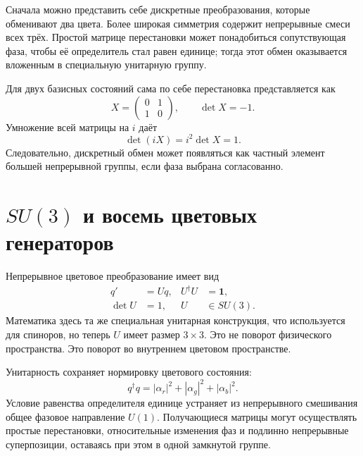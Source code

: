 Сначала можно представить себе дискретные преобразования, которые обменивают два цвета. Более широкая симметрия содержит непрерывные смеси всех трёх. Простой матрице перестановки может понадобиться сопутствующая фаза, чтобы её определитель стал равен единице; тогда этот обмен оказывается вложенным в специальную унитарную группу.

Для двух базисных состояний сама по себе перестановка представляется как
\begin{equation}
X=
\begin{pmatrix}0&1\\1&0\end{pmatrix},
\qquad
\det X=-1.
\end{equation}
Умножение всей матрицы на \(i\) даёт
\begin{equation}
\det(iX)=i^2\det X=1.
\end{equation}
Следовательно, дискретный обмен может появляться как частный элемент большей непрерывной группы, если фаза выбрана согласованно.

\begin{classroomqa}
\end{classroomqa}

\section{\texorpdfstring{\(SU(3)\)}{SU(3)} и восемь цветовых генераторов}

Непрерывное цветовое преобразование имеет вид
\begin{equation}
\begin{aligned}
q'&=Uq,
&
U^\dagger U&=\boldsymbol 1,
\\
\det U&=1,
&
U&\in SU(3).
\end{aligned}
\label{eq:l3-su3-action}
\end{equation}
Математика здесь та же специальная унитарная конструкция, что используется для спиноров, но теперь \(U\) имеет размер \(3\times3\). Это не поворот физического пространства. Это поворот во внутреннем цветовом пространстве.

Унитарность сохраняет нормировку цветового состояния:
\begin{equation}
q^\dagger q
=|\alpha_r|^2+|\alpha_g|^2+|\alpha_b|^2.
\end{equation}
Условие равенства определителя единице устраняет из непрерывного смешивания общее фазовое направление \(U(1)\). Получающиеся матрицы могут осуществлять простые перестановки, относительные изменения фаз и подлинно непрерывные суперпозиции, оставаясь при этом в одной замкнутой группе.


